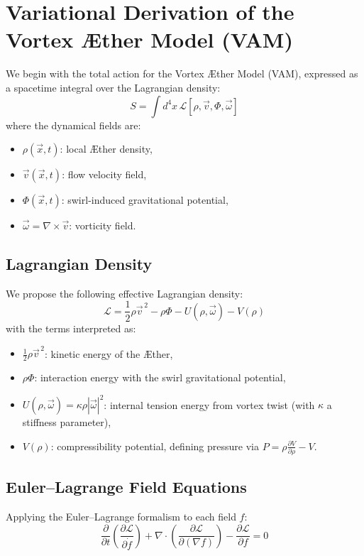 \section{Variational Derivation of the Vortex \AE ther Model (VAM)}

We begin with the total action for the Vortex \AE ther Model (VAM), expressed as a spacetime integral over the Lagrangian density:
\begin{equation}
    S = \int d^4x \, \mathcal{L}[\rho, \vec{v}, \Phi, \vec{\omega}]
\end{equation}
where the dynamical fields are:
\begin{itemize}
    \item $\rho(\vec{x}, t)$: local \AE ther density,
    \item $\vec{v}(\vec{x}, t)$: flow velocity field,
    \item $\Phi(\vec{x}, t)$: swirl-induced gravitational potential,
    \item $\vec{\omega} = \nabla \times \vec{v}$: vorticity field.
\end{itemize}

\subsection*{Lagrangian Density}
We propose the following effective Lagrangian density:
\begin{equation}
    \mathcal{L} = \frac{1}{2} \rho \vec{v}^{\,2} - \rho \Phi - U(\rho, \vec{\omega}) - V(\rho)
\end{equation}
with the terms interpreted as:
\begin{itemize}
    \item $\frac{1}{2} \rho \vec{v}^{\,2}$: kinetic energy of the \AE ther,
    \item $\rho \Phi$: interaction energy with the swirl gravitational potential,
    \item $U(\rho, \vec{\omega}) = \kappa \rho |\vec{\omega}|^2$: internal tension energy from vortex twist (with $\kappa$ a stiffness parameter),
    \item $V(\rho)$: compressibility potential, defining pressure via $P = \rho \frac{\partial V}{\partial \rho} - V$.
\end{itemize}

\subsection*{Euler--Lagrange Field Equations}
Applying the Euler--Lagrange formalism to each field $f$:
\begin{equation}
    \frac{\partial}{\partial t} \left( \frac{\partial \mathcal{L}}{\partial \dot{f}} \right) + \nabla \cdot \left( \frac{\partial \mathcal{L}}{\partial (\nabla f)} \right) - \frac{\partial \mathcal{L}}{\partial f} = 0
\end{equation}

